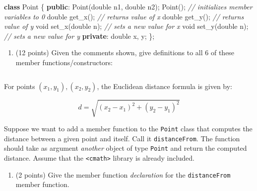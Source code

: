 \documentclass[
]{article}
\newenvironment{Shaded}{}{}
\newcommand{\CommentTok}[1]{\textcolor[rgb]{0.38,0.63,0.69}{\textit{#1}}}
\newcommand{\DataTypeTok}[1]{\textcolor[rgb]{0.56,0.13,0.00}{#1}}
\newcommand{\KeywordTok}[1]{\textcolor[rgb]{0.00,0.44,0.13}{\textbf{#1}}}
\newcommand{\NormalTok}[1]{#1}
\providecommand{\tightlist}{%
  \setlength{\itemsep}{0pt}\setlength{\parskip}{0pt}}
\begin{document}
\begin{Shaded}
\begin{Highlighting}[]
\KeywordTok{class}\NormalTok{ Point \{}
   \KeywordTok{public}\NormalTok{:}
\NormalTok{      Point(}\DataTypeTok{double}\NormalTok{ n1, }\DataTypeTok{double}\NormalTok{ n2);}
\NormalTok{      Point(); }\CommentTok{// initializes member variables to 0}
      \DataTypeTok{double}\NormalTok{ get\_x(); }\CommentTok{// returns value of x}
      \DataTypeTok{double}\NormalTok{ get\_y(); }\CommentTok{// returns value of y}
      \DataTypeTok{void}\NormalTok{ set\_x(}\DataTypeTok{double}\NormalTok{ n); }\CommentTok{// sets a new value for x}
      \DataTypeTok{void}\NormalTok{ set\_y(}\DataTypeTok{double}\NormalTok{ n); }\CommentTok{// sets a new value for y}
   \KeywordTok{private}\NormalTok{:}
      \DataTypeTok{double}\NormalTok{ x, y;}
\NormalTok{\};}
\end{Highlighting}
\end{Shaded}

\begin{enumerate}
\def\labelenumi{\alph{enumi}.}
\tightlist
\item
  (12 points) Given the comments shown, give definitions to all 6 of
  these member functions/constructors:
\end{enumerate}

\begin{verbatim}
\end{verbatim}

\pagebreak

For points \((x_1, y_1), (x_2, y_2)\), the Euclidean distance formula is
given by:

\begin{equation*}
d = \sqrt{(x_2 - x_1)^2 + (y_2 - y_1)^2}
\end{equation*}

Suppose we want to add a member function to the \texttt{Point} class
that computes the distance between a given point and itself. Call it
\texttt{distanceFrom}. The function should take as argument
\emph{another} object of type \texttt{Point} and return the computed
distance. Assume that the \texttt{\textless{}cmath\textgreater{}}
library is already included.

\begin{enumerate}
\def\labelenumi{\alph{enumi}.}
\setcounter{enumi}{1}
\tightlist
\item
  (2 points) Give the member function \emph{declaration} for the
  \texttt{distanceFrom} member function.
\end{enumerate}
\end{document}
